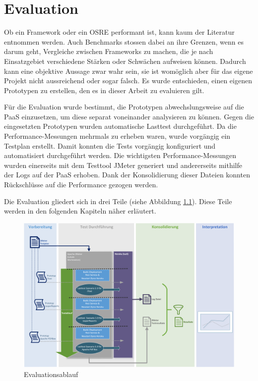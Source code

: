 \documentclass[main.tex]{subfiles}
\begin{document}
\chapter{Evaluation}

Ob ein Framework oder ein OSRE performant ist, kann kaum der Literatur entnommen werden. Auch Benchmarks stossen dabei an ihre Grenzen, wenn es darum geht, Vergleiche zwischen Frameworks zu machen, die je nach Einsatzgebiet verschiedene Stärken oder Schwächen aufweisen können. Dadurch kann eine objektive Aussage zwar wahr sein, sie ist womöglich aber für das eigene Projekt nicht aussreichend oder sogar falsch. Es wurde entschieden, einen eigenen Prototypen zu erstellen, den es in dieser Arbeit zu evaluieren gilt. 

Für die Evaluation wurde bestimmt, die Prototypen abwechslungsweise auf die PaaS einzusetzen, um diese separat voneinander analysieren zu können. Gegen die eingesetzten Prototypen wurden automatische Lasttest durchgeführt. Da die Performance-Messungen mehrmals zu erheben waren, wurde vorgängig ein Testplan erstellt. Damit konnten die Tests vorgängig konfiguriert und automatisiert durchgeführt werden. Die wichtigsten Performance-Messungen wurden einerseits mit dem Testtool JMeter generiert und andererseits mithilfe der Logs auf der PaaS erhoben. Dank der Konsolidierung dieser Dateien konnten Rückschlüsse auf die Performance gezogen werden.

Die Evaluation gliedert sich in drei Teile (siehe Abbildung \ref{figure:evaluationsAblauf}). Diese Teile werden in den folgenden Kapiteln näher erläutert.

\begin{figure}[h]
\includegraphics[width=\textwidth]{mainpart/3_methodik_evaluation_img/Testablauf.png}
 \caption{Evaluationsablauf}
 \label{figure:evaluationsAblauf}
\end{figure}
\end{document}
